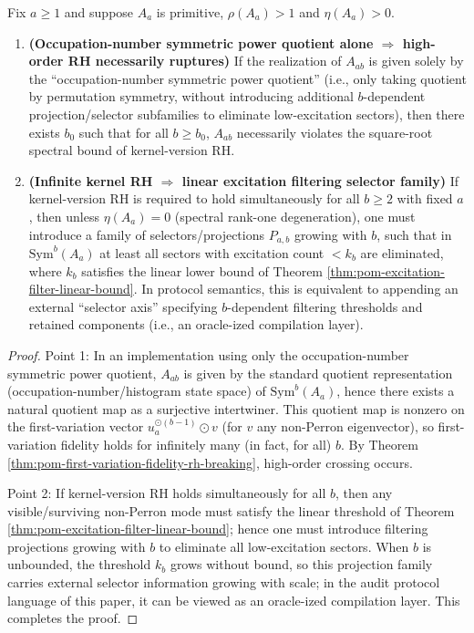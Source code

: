 \begin{theorem}[Occupation-number symmetric power quotient alone \texorpdfstring{$\Rightarrow$}{=>} high-order RH necessarily ruptures; infinite kernel RH \texorpdfstring{$\Rightarrow$}{=>} linear excitation filtering selector family]\label{thm:pom-occupancy-symquotient-rh-obstruction}
Fix \(a\ge 1\) and suppose \(A_a\) is primitive, \(\rho(A_a)>1\) and \(\eta(A_a)>0\).
\begin{enumerate}
  \item \textbf{(Occupation-number symmetric power quotient alone \(\Rightarrow\) high-order RH necessarily ruptures)}
  If the realization of \(A_{ab}\) is given solely by the ``occupation-number symmetric power quotient'' (i.e., only taking quotient by permutation symmetry, without introducing additional \(b\)-dependent projection/selector subfamilies to eliminate low-excitation sectors),
  then there exists \(b_0\) such that for all \(b\ge b_0\), \(A_{ab}\) necessarily violates the square-root spectral bound of kernel-version RH.
  \item \textbf{(Infinite kernel RH \(\Rightarrow\) linear excitation filtering selector family)}
  If kernel-version RH is required to hold simultaneously for all \(b\ge 2\) with fixed \(a\), then unless \(\eta(A_a)=0\) (spectral rank-one degeneration), one must introduce a family of selectors/projections \(P_{a,b}\) growing with \(b\), such that in \(\mathrm{Sym}^b(A_a)\) at least all sectors with excitation count \(<k_b\) are eliminated, where \(k_b\) satisfies the linear lower bound of Theorem \ref{thm:pom-excitation-filter-linear-bound}.
  In protocol semantics, this is equivalent to appending an external ``selector axis'' specifying \(b\)-dependent filtering thresholds and retained components (i.e., an oracle-ized compilation layer).
\end{enumerate}
\end{theorem}
\begin{proof}
Point 1: In an implementation using only the occupation-number symmetric power quotient, \(A_{ab}\) is given by the standard quotient representation (occupation-number/histogram state space) of \(\mathrm{Sym}^b(A_a)\), hence there exists a natural quotient map as a surjective intertwiner.
This quotient map is nonzero on the first-variation vector \(u_a^{\odot(b-1)}\odot v\) (for \(v\) any non-Perron eigenvector), so first-variation fidelity holds for infinitely many (in fact, for all) \(b\). By Theorem \ref{thm:pom-first-variation-fidelity-rh-breaking}, high-order crossing occurs.
\par
Point 2: If kernel-version RH holds simultaneously for all \(b\), then any visible/surviving non-Perron mode must satisfy the linear threshold of Theorem \ref{thm:pom-excitation-filter-linear-bound}; hence one must introduce filtering projections growing with \(b\) to eliminate all low-excitation sectors.
When \(b\) is unbounded, the threshold \(k_b\) grows without bound, so this projection family carries external selector information growing with scale; in the audit protocol language of this paper, it can be viewed as an oracle-ized compilation layer. This completes the proof.
\end{proof}

